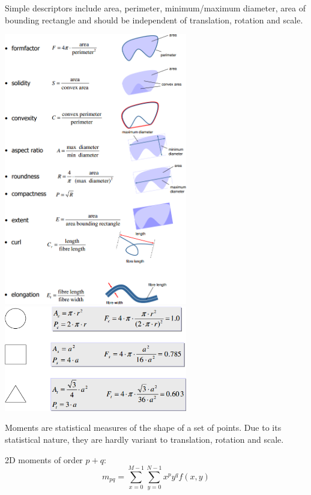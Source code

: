   \clearpage
  \begin{minipage}{9cm}
    Simple descriptors include area, perimeter, minimum/maximum diameter, area of bounding rectangle and
    should be independent of translation, rotation and scale.
     
    \includegraphics[width=8cm]{./images/simple_descriptors.png}
    \includegraphics[width=8cm]{./images/simple_descriptors_formfactors.png}
    
    
      Moments are statistical measures of the shape of a set of points. Due to its statistical
      nature, they are hardly variant to translation, rotation and scale.
      
      2D moments of order $p+q$: $$m_{pq} = \sum_{x=0}^{M-1} \sum_{y=0}^{N-1} x^p y^q f(x,y)$$
      
  \end{minipage}
